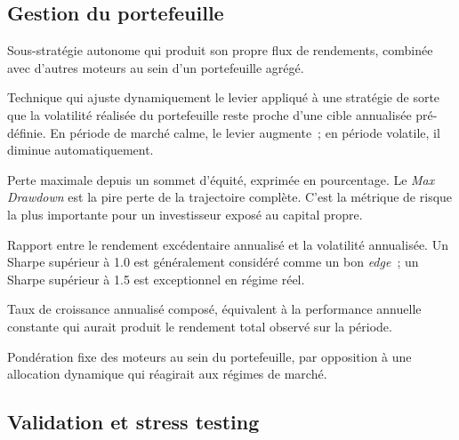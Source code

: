 \subsection*{Gestion du portefeuille}

\begin{description}[style=nextline, leftmargin=0.5cm, itemsep=0.4em]
\item[\textbf{Moteur} (ou sleeve)] Sous-stratégie autonome qui produit son propre flux de rendements, combinée avec d'autres moteurs au sein d'un portefeuille agrégé.

\item[\textbf{Vol targeting} (ciblage de volatilité)] Technique qui ajuste dynamiquement le levier appliqué à une stratégie de sorte que la volatilité réalisée du portefeuille reste proche d'une cible annualisée pré-définie. En période de marché calme, le levier augmente~; en période volatile, il diminue automatiquement.

\item[\textbf{Drawdown}] Perte maximale depuis un sommet d'équité, exprimée en pourcentage. Le \emph{Max Drawdown} est la pire perte de la trajectoire complète. C'est la métrique de risque la plus importante pour un investisseur exposé au capital propre.

\item[\textbf{Sharpe Ratio}] Rapport entre le rendement excédentaire annualisé et la volatilité annualisée. Un Sharpe supérieur à 1.0 est généralement considéré comme un bon \emph{edge}~; un Sharpe supérieur à 1.5 est exceptionnel en régime réel.

\item[\textbf{CAGR} (Compound Annual Growth Rate)] Taux de croissance annualisé composé, équivalent à la performance annuelle constante qui aurait produit le rendement total observé sur la période.

\item[\textbf{Allocation statique}] Pondération fixe des moteurs au sein du portefeuille, par opposition à une allocation dynamique qui réagirait aux régimes de marché.
\end{description}

\subsection*{Validation et stress testing}


